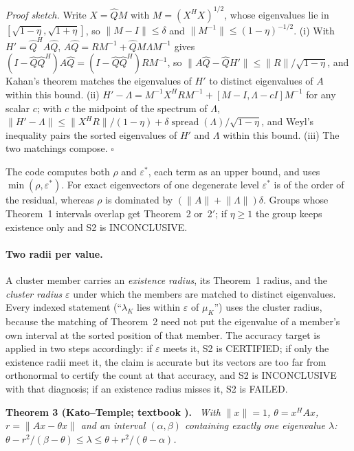 \documentclass[11pt,a4paper]{article}
\newcommand{\status}[1]{\textsf{#1}}
\newcommand{\CERT}{\status{CERTIFIED}}
\newcommand{\FAIL}{\status{FAILED}}
\newcommand{\INC}{\status{INCONCLUSIVE}}
\newcommand{\norm}[1]{\lVert #1\rVert}
\newenvironment{result}[1]{\par\medskip\noindent\textbf{#1.}\ \itshape}{\par\medskip}
\begin{document}
\noindent\emph{Proof sketch.} Write $X=\hat QM$ with $M=(X^HX)^{1/2}$, whose eigenvalues lie in
$[\sqrt{1-\eta},\sqrt{1+\eta}]$, so $\norm{M-I}\le\delta$ and $\norm{M^{-1}}\le(1-\eta)^{-1/2}$. (i) With
$H'=\hat Q^HA\hat Q$, $A\hat Q=RM^{-1}+\hat QM\Lambda M^{-1}$ gives $(I-\hat Q\hat Q^H)A\hat Q=(I-\hat Q\hat Q^H)RM^{-1}$,
so $\norm{A\hat Q-\hat QH'}\le\norm{R}/\sqrt{1-\eta}$, and Kahan's theorem matches the eigenvalues of $H'$ to distinct
eigenvalues of $A$ within this bound. (ii) $H'-\Lambda=M^{-1}X^HRM^{-1}+[M-I,\Lambda-cI]M^{-1}$ for any scalar $c$;
with $c$ the midpoint of the spectrum of $\Lambda$, $\norm{H'-\Lambda}\le\norm{X^HR}/(1-\eta)+\delta\operatorname{spread}
(\Lambda)/\sqrt{1-\eta}$, and Weyl's inequality pairs the sorted eigenvalues of $H'$ and $\Lambda$ within this bound.
(iii) The two matchings compose. $\square$

\smallskip
The code computes both $\rho$ and $\varepsilon^*$, each term as an upper bound, and uses $\min(\rho,\varepsilon^*)$.
For exact eigenvectors of one degenerate level $\varepsilon^*$ is of the order of the residual, whereas $\rho$ is
dominated by $(\norm{A}+\norm{\Lambda})\delta$. Groups whose Theorem~1 intervals overlap get Theorem~2 or~2$'$; if
$\eta\ge1$ the group keeps existence only and S2 is \INC.

\paragraph{Two radii per value.}
A cluster member carries an \emph{existence radius}, its Theorem~1 radius, and the \emph{cluster radius}
$\varepsilon$ under which the members are matched to distinct eigenvalues. Every indexed statement (``$\lambda_K$ lies
within $\varepsilon$ of $\mu_K$'') uses the cluster radius, because the matching of Theorem~2 need not put the
eigenvalue of a member's own interval at the sorted position of that member. The accuracy target is applied in two
steps accordingly: if $\varepsilon$ meets it, S2 is \CERT; if only the existence radii meet it, the claim is accurate
but its vectors are too far from orthonormal to certify the count at that accuracy, and S2 is \INC{} with that
diagnosis; if an existence radius misses it, S2 is \FAIL.

\begin{result}{Theorem 3 (Kato--Temple; textbook \cite{Kato1949,Temple1928})}
With $\norm{x}=1$, $\theta=x^HAx$, $r=\norm{Ax-\theta x}$ and an interval $(\alpha,\beta)$ containing exactly one
eigenvalue $\lambda$: $\theta-r^2/(\beta-\theta)\le\lambda\le\theta+r^2/(\theta-\alpha)$.
\end{result}
\end{document}
